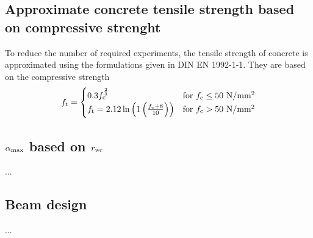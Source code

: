 \subsection{Approximate concrete tensile strength based on compressive strenght}
To reduce the number of required experiments, the tensile strength of concrete is approximated using the formulations given in DIN EN 1992-1-1.
They are based on the compressive strength 
\begin{align}
f_{\text{t}} = 
\begin{cases}
0.3 f_{\text{c}}^{\frac{2}{3}}  & \text{for $f_{\text{c}} \le 50$ N/mm$^2$}\\
f_{\text{t}} =2.12 \ln \left( 1 \left( \frac{f_{\text{c}} + 8}{10}\right) \right)& \text{for $f_{\text{c}} > 50$ N/mm$^2$}  \label{eq:tensilstrength}
\end{cases}
\end{align}
\subsection{$\alpha_{\text{max}}$ based on $r_{\text{wc}}$}
...
\subsection{Beam design}
...